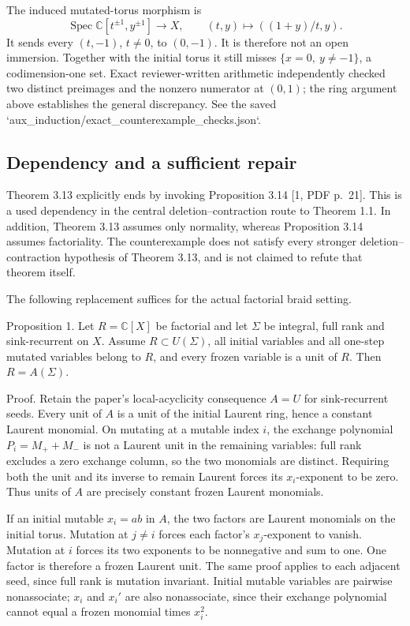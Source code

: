 \documentclass[10pt]{article}
\begin{document}
The induced mutated-torus morphism is \[\operatorname{Spec}\mathbb C[t^{\pm1},y^{\pm1}]\longrightarrow X,\qquad
 (t,y)\longmapsto((1+y)/t,y).\] It sends every \((t,-1)\), \(t\ne0\), to \((0,-1)\). It is therefore not an open immersion. Together with the initial torus it still misses \(\{x=0,\ y\ne-1\}\), a codimension-one set. Exact reviewer-written arithmetic independently checked two distinct preimages and the nonzero numerator at \((0,1)\); the ring argument above establishes the general discrepancy. See the saved `aux\_induction/exact\_counterexample\_checks.json`.\par
\subsection*{Dependency and a sufficient repair}
Theorem 3.13 explicitly ends by invoking Proposition 3.14 [1, PDF p. 21]. This is a used dependency in the central deletion–contraction route to Theorem 1.1. In addition, Theorem 3.13 assumes only normality, whereas Proposition 3.14 assumes factoriality. The counterexample does not satisfy every stronger deletion–contraction hypothesis of Theorem 3.13, and is not claimed to refute that theorem itself.\par
The following replacement suffices for the actual factorial braid setting.\par
Proposition 1.  Let \(R=\mathbb C[X]\) be factorial and let \(\Sigma\) be integral, full rank and sink-recurrent on \(X\). Assume \(R\subset U(\Sigma)\), all initial variables and all one-step mutated variables belong to \(R\), and every frozen variable is a unit of \(R\). Then \(R=A(\Sigma)\).\par
Proof. Retain the paper’s local-acyclicity consequence \(A=U\) for sink-recurrent seeds. Every unit of \(A\) is a unit of the initial Laurent ring, hence a constant Laurent monomial. On mutating at a mutable index \(i\), the exchange polynomial \(P_i=M_++M_-\) is not a Laurent unit in the remaining variables: full rank excludes a zero exchange column, so the two monomials are distinct. Requiring both the unit and its inverse to remain Laurent forces its \(x_i\)-exponent to be zero. Thus units of \(A\) are precisely constant frozen Laurent monomials.\par
If an initial mutable \(x_i=ab\) in \(A\), the two factors are Laurent monomials on the initial torus. Mutation at \(j\ne i\) forces each factor’s \(x_j\)-exponent to vanish. Mutation at \(i\) forces its two exponents to be nonnegative and sum to one. One factor is therefore a frozen Laurent unit. The same proof applies to each adjacent seed, since full rank is mutation invariant. Initial mutable variables are pairwise nonassociate; \(x_i\) and \(x_i'\) are also nonassociate, since their exchange polynomial cannot equal a frozen monomial times \(x_i^2\).\par
\end{document}
